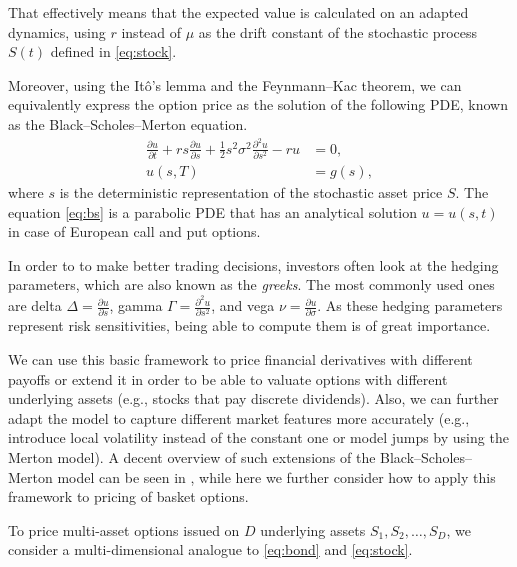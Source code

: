 \documentclass{UUThesisTemplate}
\begin{document}
That effectively means that the expected value is calculated on an adapted dynamics, using $r$ instead of $\mu$ as the drift constant of the stochastic process $S(t)$ defined in \eqref{eq:stock}. 
\par Moreover, using the It\^o's lemma and the Feynmann--Kac theorem, we can equivalently express the option price as the solution of the following PDE, known as the Black--Scholes--Merton equation.
\begin{align}
\frac{\partial u}{\partial t} + r s \frac{\partial u} {\partial s} + \frac{1}{2} s^2 \sigma^2 \frac{\partial^2 u}{\partial s^2} - r u &= 0, \nonumber \\
u(s,T) &= g(s), \label{eq:bs}
\end{align}
where $s$ is the deterministic representation of the stochastic asset price $S$. The equation \eqref{eq:bs} is a parabolic PDE that has an analytical solution $u=u(s,t)$ in case of European call and put options. %
\par In order to to make better trading decisions, investors often look at the hedging parameters, which are also known as the \emph{greeks}. The most commonly used ones are delta $\Delta = \frac{\partial u}{\partial s}$, gamma $\Gamma = \frac{\partial^2 u}{\partial s^2}$, and vega $\nu = \frac{\partial u}{\partial \sigma}$. As these hedging parameters represent risk sensitivities, being able to compute them is of great importance.
\par We can use this basic framework to price financial derivatives with different payoffs or extend it in order to be able to valuate options with different underlying assets (e.g., stocks that pay discrete dividends). Also, we can further adapt the model to capture different market features more accurately (e.g., introduce local volatility instead of the constant one or model jumps by using the Merton model). A decent overview of such extensions of the Black--Scholes--Merton model can be seen in \cite{paper2}, while here we further consider how to apply this framework to pricing of basket options.
\par To price multi-asset options issued on $D$ underlying assets $S_1,S_2,\ldots,S_D$, we consider a multi-dimensional analogue to \eqref{eq:bond} and \eqref{eq:stock}.
\end{document}

